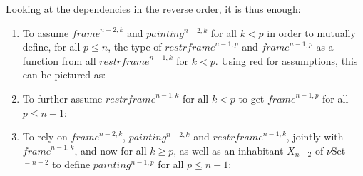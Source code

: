 \documentclass{article}
\newcommand{\myframe}{\mathit{frame}}
\newcommand{\painting}{\mathit{painting}}
\newcommand{\restrframe}{\mathit{restrframe}}
\begin{document}
Looking at the dependencies in the reverse order, it is thus enough:
\begin{enumerate}
  \item To assume $\myframe^{n-2,k}$ and $\painting^{n-2,k}$ for all $k< p$
        in order to mutually define, for all $p\leq n$, the type of
        $\restrframe^{n-1,p}$ and $\myframe^{n-1,p}$ as a function from all
        $\restrframe^{n-1,k}$ for $k< p$. Using red for assumptions, this
        can be pictured as:
        \begin{center}
        \end{center}

  \item To further assume $\restrframe^{n-1,k}$ for all $k<p$ to get
        $\myframe^{n-1,p}$ for all $p\leq n-1$:
        \begin{center}
        \end{center}

  \item To rely on $\myframe^{n-2,k}$, $\painting^{n-2,k}$ and
        $\restrframe^{n-1,k}$, jointly with $\myframe^{n-1,k}$, and now for all
        $k \geq p$, as well as an inhabitant $X_{n-2}$ of $\nu$Set$^{=n-2}$
        to define $\painting^{n-1,p}$ for all $p \leq n-1$:
        \begin{center}
        \end{center}


\end{enumerate}
\end{document}
